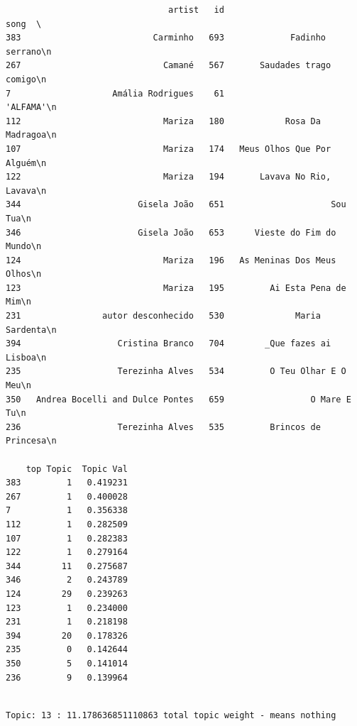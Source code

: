 \documentclass[11pt]{article}
\begin{document}
    
    \begin{verbatim}
                                artist   id                          song  \
383                          Carminho   693             Fadinho serrano\n   
267                            Camané   567       Saudades trago comigo\n   
7                    Amália Rodrigues    61                    'ALFAMA'\n   
112                            Mariza   180            Rosa Da Madragoa\n   
107                            Mariza   174   Meus Olhos Que Por Alguém\n   
122                            Mariza   194       Lavava No Rio, Lavava\n   
344                       Gisela João   651                     Sou Tua\n   
346                       Gisela João   653      Vieste do Fim do Mundo\n   
124                            Mariza   196   As Meninas Dos Meus Olhos\n   
123                            Mariza   195         Ai Esta Pena de Mim\n   
231                autor desconhecido   530              Maria Sardenta\n   
394                   Cristina Branco   704        _Que fazes ai Lisboa\n   
235                   Terezinha Alves   534         O Teu Olhar E O Meu\n   
350   Andrea Bocelli and Dulce Pontes   659                 O Mare E Tu\n   
236                   Terezinha Alves   535         Brincos de Princesa\n   

    top Topic  Topic Val  
383         1   0.419231  
267         1   0.400028  
7           1   0.356338  
112         1   0.282509  
107         1   0.282383  
122         1   0.279164  
344        11   0.275687  
346         2   0.243789  
124        29   0.239263  
123         1   0.234000  
231         1   0.218198  
394        20   0.178326  
235         0   0.142644  
350         5   0.141014  
236         9   0.139964  
    \end{verbatim}

    
    \begin{Verbatim}[commandchars=\\\{\}]

Topic: 13 : 11.178636851110863 total topic weight - means nothing

    \end{Verbatim}
\end{document}
